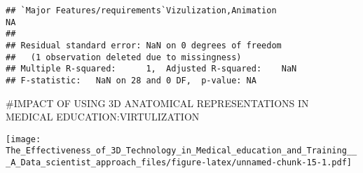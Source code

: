 \documentclass[]{article}
\newenvironment{Shaded}{\begin{snugshade}}{\end{snugshade}}
\newcommand{\CommentTok}[1]{\textcolor[rgb]{0.56,0.35,0.01}{\textit{#1}}}
\newcommand{\DataTypeTok}[1]{\textcolor[rgb]{0.13,0.29,0.53}{#1}}
\newcommand{\KeywordTok}[1]{\textcolor[rgb]{0.13,0.29,0.53}{\textbf{#1}}}
\newcommand{\NormalTok}[1]{#1}
\newcommand{\OperatorTok}[1]{\textcolor[rgb]{0.81,0.36,0.00}{\textbf{#1}}}
\newcommand{\OtherTok}[1]{\textcolor[rgb]{0.56,0.35,0.01}{#1}}
\newcommand{\StringTok}[1]{\textcolor[rgb]{0.31,0.60,0.02}{#1}}
\begin{document}
\begin{verbatim}
## `Major Features/requirements`Vizulization,Animation                                                                                                                                                                                                                                                                                                                                                                                                                                   NA
## 
## Residual standard error: NaN on 0 degrees of freedom
##   (1 observation deleted due to missingness)
## Multiple R-squared:      1,  Adjusted R-squared:    NaN 
## F-statistic:   NaN on 28 and 0 DF,  p-value: NA
\end{verbatim}

\#IMPACT OF USING 3D ANATOMICAL REPRESENTATIONS IN MEDICAL
EDUCATION:VIRTULIZATION

\begin{Shaded}
\end{Shaded}

\texttt{[image: The\_Effectiveness\_of\_3D\_Technology\_in\_Medical\_education\_and\_Training\_\_\_A\_Data\_scientist\_approach\_files/figure-latex/unnamed-chunk-15-1.pdf]}
\end{document}
